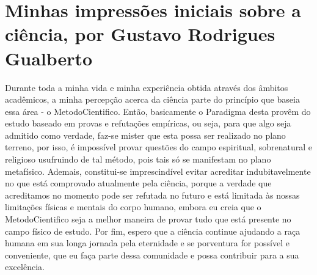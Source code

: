\section{Minhas impressões iniciais sobre a ciência, por Gustavo Rodrigues Gualberto}

Durante toda a minha vida e minha experiência obtida através dos âmbitos acadêmicos, a minha percepção acerca da ciência parte do princípio que baseia essa área - o \gls{MetodoCientifico}. Então, basicamente o \gls{Paradigma} desta provêm do estudo baseado em provas e refutações empíricas, ou seja, para que algo seja admitido como verdade, faz-se mister que esta possa ser realizado no plano terreno, por isso, é impossível provar questões do campo espiritual, sobrenatural e religioso usufruindo de tal método, pois tais só se manifestam no plano metafísico. Ademais, constitui-se imprescindível evitar acreditar indubitavelmente no que está comprovado atualmente pela ciência, porque a verdade que acreditamos no momento pode ser refutada no futuro e está limitada às nossas limitações físicas e mentais do corpo humano, embora eu creia que o \gls{MetodoCientifico} seja a melhor maneira de provar tudo que está presente no campo físico de estudo. Por fim, espero que a ciência continue ajudando a raça humana em sua longa jornada pela eternidade e se porventura for possível e conveniente, que eu faça parte dessa comunidade e possa contribuir para a sua excelência.

\citep{noauthor_paradigma_nodate}
